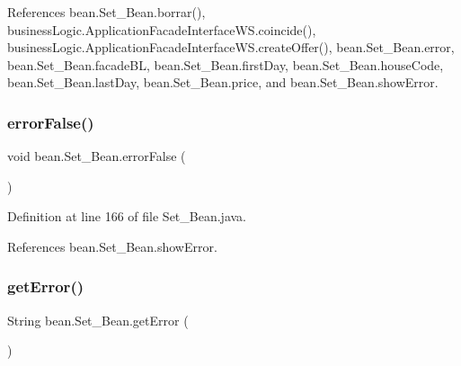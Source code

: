 References bean.\+Set\+\_\+\+Bean.\+borrar(), business\+Logic.\+Application\+Facade\+Interface\+W\+S.\+coincide(), business\+Logic.\+Application\+Facade\+Interface\+W\+S.\+create\+Offer(), bean.\+Set\+\_\+\+Bean.\+error, bean.\+Set\+\_\+\+Bean.\+facade\+BL, bean.\+Set\+\_\+\+Bean.\+first\+Day, bean.\+Set\+\_\+\+Bean.\+house\+Code, bean.\+Set\+\_\+\+Bean.\+last\+Day, bean.\+Set\+\_\+\+Bean.\+price, and bean.\+Set\+\_\+\+Bean.\+show\+Error.

\mbox{\label{classbean_1_1Set__Bean_a627ff4ed667dd2be57ea46f8c196cda7}} 
\subsubsection{\texorpdfstring{errorFalse()}{errorFalse()}}
{\footnotesize\ttfamily void bean.\+Set\+\_\+\+Bean.\+error\+False (\begin{DoxyParamCaption}{ }\end{DoxyParamCaption})}



Definition at line 166 of file Set\+\_\+\+Bean.\+java.


\begin{DoxyCode}{0}

\end{DoxyCode}


References bean.\+Set\+\_\+\+Bean.\+show\+Error.

\mbox{\label{classbean_1_1Set__Bean_ab9e88a7d0e094271ff7f9fb337f66c11}} 
\subsubsection{\texorpdfstring{getError()}{getError()}}
{\footnotesize\ttfamily String bean.\+Set\+\_\+\+Bean.\+get\+Error (\begin{DoxyParamCaption}{ }\end{DoxyParamCaption})}




